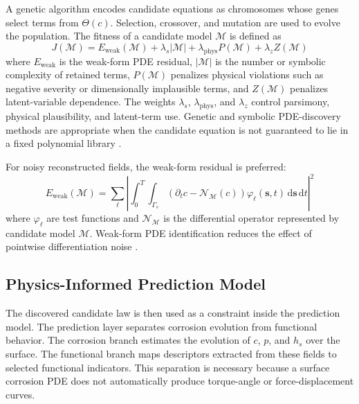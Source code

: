 \documentclass[colorlinks,upint,subscriptcorrection,varvw,hyphenate,balance]{asmeconf}
\newcommand{\vect}[1]{\bm{#1}}
\newcommand{\surf}{\Gamma_s}
\newcommand{\diff}{\mathrm{d}}
\begin{document}
A genetic algorithm encodes candidate equations as chromosomes whose genes select terms from $\Theta(c)$. Selection, crossover, and mutation are used to evolve the population. The fitness of a candidate model $\mathcal{M}$ is defined as
\begin{equation}
J(\mathcal{M})=E_{\mathrm{weak}}(\mathcal{M})+\lambda_s|\mathcal{M}|+\lambda_{\mathrm{phys}}P(\mathcal{M})+\lambda_zZ(\mathcal{M})
\label{eq:gafitness}
\end{equation}
where $E_{\mathrm{weak}}$ is the weak-form PDE residual, $|\mathcal{M}|$ is the number or symbolic complexity of retained terms, $P(\mathcal{M})$ penalizes physical violations such as negative severity or dimensionally implausible terms, and $Z(\mathcal{M})$ penalizes latent-variable dependence. The weights $\lambda_s$, $\lambda_{\mathrm{phys}}$, and $\lambda_z$ control parsimony, physical plausibility, and latent-term use. Genetic and symbolic PDE-discovery methods are appropriate when the candidate equation is not guaranteed to lie in a fixed polynomial library \cite{xu2020dlga,chen2022sga,cohen2024pigp}.

For noisy reconstructed fields, the weak-form residual is preferred:
\begin{equation}
E_{\mathrm{weak}}(\mathcal{M})=\sum_{\ell}\left|\int_{0}^{T}\int_{\surf}\left(\partial_t c-\mathcal{N}_{\mathcal{M}}(c)\right)\varphi_{\ell}(\vect{s},t)\,\diff\vect{s}\,\diff t\right|^2
\label{eq:weakresidual}
\end{equation}
where $\varphi_{\ell}$ are test functions and $\mathcal{N}_{\mathcal{M}}$ is the differential operator represented by candidate model $\mathcal{M}$. Weak-form PDE identification reduces the effect of pointwise differentiation noise \cite{messenger2021wsindy,stephany2024weakpdelearn}.


\subsection{Physics-Informed Prediction Model}
The discovered candidate law is then used as a constraint inside the prediction model. The prediction layer separates corrosion evolution from functional behavior. The corrosion branch estimates the evolution of $c$, $p$, and $h_s$ over the surface. The functional branch maps descriptors extracted from these fields to selected functional indicators. This separation is necessary because a surface corrosion PDE does not automatically produce torque-angle or force-displacement curves.
\end{document}
